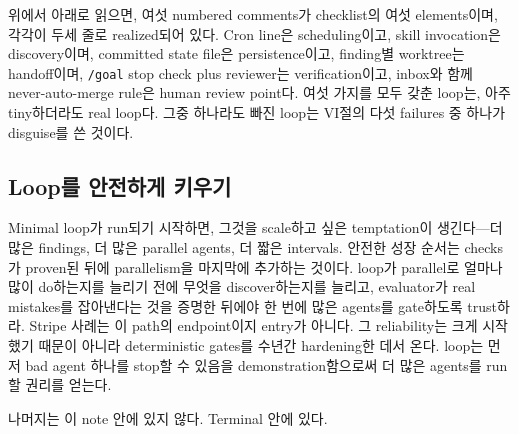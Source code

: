\documentclass[conference]{IEEEtran}
\begin{document}

위에서 아래로 읽으면, 여섯 numbered comments가 checklist의 여섯 elements이며, 각각이 두세 줄로 realized되어 있다. Cron line은 scheduling이고, skill invocation은 discovery이며, committed state file은 persistence이고, finding별 worktree는 handoff이며, \texttt{/goal} stop check plus reviewer는 verification이고, inbox와 함께 never-auto-merge rule은 human review point다. 여섯 가지를 모두 갖춘 loop는, 아주 tiny하더라도 real loop다. 그중 하나라도 빠진 loop는 VI절의 다섯 failures 중 하나가 disguise를 쓴 것이다.

\subsection{Loop를 안전하게 키우기}
Minimal loop가 run되기 시작하면, 그것을 scale하고 싶은 temptation이 생긴다---더 많은 findings, 더 많은 parallel agents, 더 짧은 intervals. 안전한 성장 순서는 checks가 proven된 뒤에 parallelism을 마지막에 추가하는 것이다. loop가 parallel로 얼마나 많이 do하는지를 늘리기 전에 무엇을 discover하는지를 늘리고, evaluator가 real mistakes를 잡아낸다는 것을 증명한 뒤에야 한 번에 많은 agents를 gate하도록 trust하라. Stripe 사례는 이 path의 endpoint이지 entry가 아니다. 그 reliability는 크게 시작했기 때문이 아니라 deterministic gates를 수년간 hardening한 데서 온다. loop는 먼저 bad agent 하나를 stop할 수 있음을 demonstration함으로써 더 많은 agents를 run할 권리를 얻는다.

나머지는 이 note 안에 있지 않다. Terminal 안에 있다.
\end{document}
